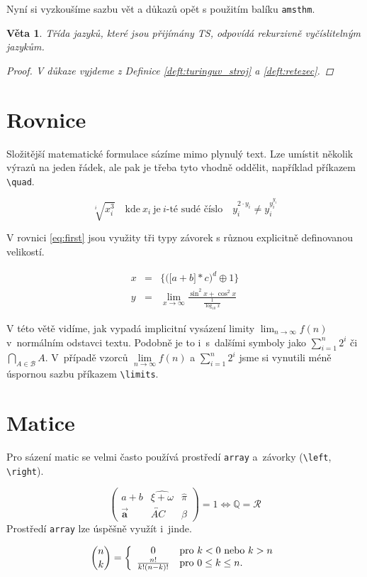 \documentclass[twocolumn,11pt]{article}
\theoremstyle{plain}
\newtheorem{lem}{Věta}
\begin{document}
Nyní si vyzkoušíme sazbu vět a důkazů opět s použitím balíku \verb|amsthm|.
\begin{lem}
Třída jazyků, které jsou přijímány TS, odpovídá {\normalfont rekurzivně vyčíslitelným jazykům.}

\begin{proof}
V důkaze vyjdeme z Definice \ref{deft:turinguv_stroj} a \ref{deft:retezec}.
\end{proof}
\end{lem}

\section{Rovnice}
Složitější matematické formulace sázíme mimo plynulý text. Lze umístit několik výrazů na jeden řádek, ale pak je třeba tyto vhodně oddělit, například příkazem \verb|\quad|.

\[
\sqrt[i]{x^3_i}\quad\text{kde}\ x_i\ \text{je}\ i\text{-té sudé číslo}\quad y^{2\cdot y_i}_i \ne y^{y^{y_i}_i}_i
\]

V rovnici \eqref{eq:first} jsou využity tři typy závorek s různou explicitně definovanou velikostí.

\begin{eqnarray}
x &= &\bigg\{\Big(\big[a + b \big] * c \Big)^d \oplus 1 \bigg\}\label{eq:first}\\
y &= &\lim_{x\to\infty}\frac{\sin^2 x + \cos^2 x}{\frac{1}{\log_{10} x}}\label{eq:second}
\end{eqnarray}

V této větě vidíme, jak vypadá implicitní vysázení limity $\lim_{n\to\infty} f(n)$ v~normálním odstavci textu. Podobně je to i~s~dalšími symboly jako $\sum_{i=1}^{n} 2^i$ či $\bigcap_{A\in\mathcal{B}} A$. V~případě vzorců $\lim\limits_{n\to\infty} f(n)$ a $\sum\limits_{i=1}^{n} 2^i$ jsme si vynutili méně úspornou sazbu příkazem \verb|\limits|.

\section{Matice}
Pro sázení matic se velmi často používá prostředí \verb|array| a~závorky (\verb|\left|, \verb|\right|).

\[\left(
\begin{array}{ccc}
    a+b & \widehat{\xi + \omega}  & \hat{\pi}\\
    \vec{\mathbf{a}} & \overleftrightarrow{AC} & \beta
\end{array}\right) = 1 \Longleftrightarrow \mathbb{Q} = \mathcal{R}
\]
Prostředí \verb|array| lze úspěšně využít i~jinde.

\[\binom{n}{k} = \left\{
\begin{array}{c l}
0 & \text{pro } k < 0\ \text{nebo } k > n \\ %
\frac{n!}{k!(n-k)!} & \text{pro } 0 \leq k \leq n.
\end{array} \right.
\]
\end{document}
